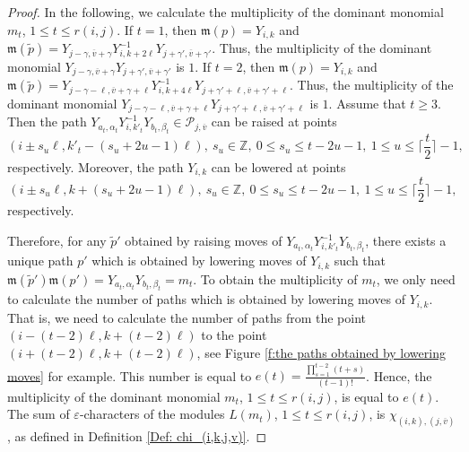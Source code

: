 \documentclass[12pt, reqno]{amsart}
\numberwithin{equation}{section}
\newcommand{\ZZ}{\mathbb{Z}}
\begin{document}
{\begin{proof}
In the following, we calculate the multiplicity of the dominant monomial $m_t$, $1\leq t\leq r(i,j)$. If $t=1$, then $\mathfrak{m}(p)=Y_{i,k}$ and $\mathfrak{m}(\widetilde{p})=Y_{j-\gamma,\overline{v}+\gamma}Y_{i,k+2 \ell}^{-1}Y_{j+\gamma',\overline{v}+\gamma'}$. Thus, the multiplicity of the dominant monomial $Y_{j-\gamma,\overline{v}+\gamma}Y_{j+\gamma',\overline{v}+\gamma'}$ is $1$. If $t=2$, then $\mathfrak{m}(p)=Y_{i,k}$ and $\mathfrak{m}(\widetilde{p})=Y_{j-\gamma- \ell,\overline{v}+\gamma+ \ell}Y_{i,k+4 \ell}^{-1}Y_{j+\gamma'+ \ell,\overline{v}+\gamma'+ \ell}$. Thus, the multiplicity of the dominant monomial $Y_{j-\gamma- \ell,\overline{v}+\gamma+ \ell}Y_{j+\gamma'+ \ell,\overline{v}+\gamma'+ \ell}$ is $1$. Assume that $t\geq 3$. Then the path $Y_{a_t,\alpha_t}Y^{-1}_{i,k'_t}Y_{b_t,\beta_t}\in \mathscr{P}_{j,\overline{v}}$ can be raised at points
\[
(i\pm s_u \ell, k'_t-(s_u+2u-1) \ell ), \ s_u \in \ZZ, \  0\leq s_u\leq t-2u-1, \ 1\leq u\leq \lceil \frac{t}2 \rceil-1,
\]
respectively. Moreover, the path $Y_{i,k}$ can be lowered at points
\[
(i\pm s_u \ell, k+(s_u+2u-1) \ell ), \ s_u \in \ZZ, \ 0\leq s_u\leq t-2u-1, \ 1\leq u\leq \lceil \frac{t}2 \rceil -1,
\]
respectively.

Therefore, for any $\widetilde{p}'$ obtained by raising moves of $Y_{a_t,\alpha_t}Y^{-1}_{i,k'_t}Y_{b_t,\beta_t}$, there exists a unique path $p'$ which is obtained by lowering moves of $Y_{i,k}$ such that $\mathfrak{m}(\widetilde{p}')\mathfrak{m}(p')=Y_{a_t,\alpha_t}Y_{b_t,\beta_t}=m_t$. To obtain the multiplicity of $m_t$, we only need to calculate the number of paths which is obtained by lowering moves of $Y_{i,k}$. That is, we need to calculate the number of paths from the point $(i-(t-2)\ell, k+(t-2) \ell)$ to the point $(i+(t-2)\ell, k+(t-2) \ell)$, see Figure \ref{f:the paths obtained by lowering moves} for example. This number is equal to $e(t) = \frac{\prod_{s=1}^{t-2} (t+s)}{(t-1)!}$. Hence, the multiplicity of the dominant monomial $m_t$, $1\leq t\leq r(i,j)$, is equal to $e(t)$. The sum of $\varepsilon$-characters of the modules $L(m_t)$, $1\leq t\leq r(i,j)$, is $\chi_{(i,k),(j,\overline{v})}$, as defined in Definition \ref{Def: chi_(i,k,j,v)}.



\end{proof}}
\end{document}
